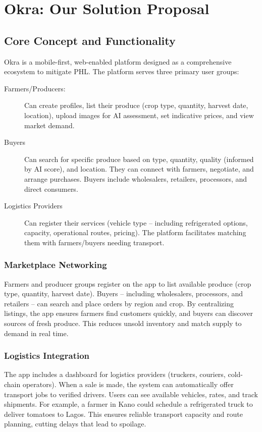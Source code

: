 \chapter[Okra: Our Solution Proposal]{Okra: Our Solution Proposal}
\label{cp:okra-solution}

{
\parindent0pt

\section{Core Concept and Functionality}
Okra is a mobile-first, web-enabled platform designed as a comprehensive ecosystem to mitigate PHL. The platform serves three primary user groups:

\begin{description}
    \item[Farmers/Producers:] Can create profiles, list their produce (crop type, quantity, harvest date, location), upload images for AI assessment, set indicative prices, and view market demand.
    
    \item[Buyers] Can search for specific produce based on type, quantity, quality (informed by AI score), and location. They can connect with farmers, negotiate, and arrange purchases. Buyers include wholesalers, retailers, processors, and direct consumers.
    
    \item[Logistics Providers] Can register their services (vehicle type – including refrigerated options, capacity, operational routes, pricing). The platform facilitates matching them with farmers/buyers needing transport.
\end{description}

\subsection{Marketplace Networking}
Farmers and producer groups register on the app to list available produce (crop type, quantity, harvest date). Buyers – including wholesalers, processors, and retailers – can search and place orders by region and crop. By centralizing listings, the app ensures farmers find customers quickly, and buyers can discover sources of fresh produce. This reduces unsold inventory and match supply to demand in real time.

\subsection{Logistics Integration}
The app includes a dashboard for logistics providers (truckers, couriers, cold-chain operators). When a sale is made, the system can automatically offer transport jobs to verified drivers. Users can see available vehicles, rates, and track shipments. For example, a farmer in Kano could schedule a refrigerated truck to deliver tomatoes to Lagos. This ensures reliable transport capacity and route planning, cutting delays that lead to spoilage.

}
